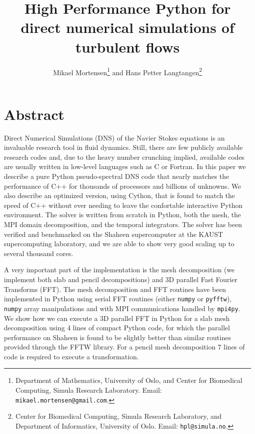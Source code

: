 \documentclass[11pt, oneside]{article}
\title{High Performance Python for direct numerical simulations of turbulent flows}
\author{Mikael Mortensen\thanks{Department of Mathematics, University of Oslo, and Center for Biomedical Computing, Simula Research Laboratory. Email: \texttt{mikael.mortensen@gmail.com}.} and Hans Petter Langtangen\thanks{Center for Biomedical Computing, Simula Research Laboratory, and Department of Informatics, University of Oslo. Email: \texttt{hpl@simula.no}.}}
\newcommand{\inpyth}{\lstinline[keywordstyle={}, basicstyle=\ttfamily]} %[]%
\begin{document}
\maketitle

\section*{Abstract}
Direct Numerical Simulations (DNS) of the Navier Stokes equations is an
invaluable research tool in fluid dynamics. Still, there are few publicly
available research codes and, due to the heavy number crunching implied,
available codes are usually written in low-level
languages such as C or Fortran.
In this paper we describe a pure Python pseudo-spectral DNS code
that nearly matches the performance of C++ for thousands of processors
and billions of unknowns. We also describe an optimized version, using
Cython, that is found to match the speed of C++ without ever needing to leave
the confortable interactive Python environment. The solver is written from
scratch in Python, both the mesh, the MPI domain decomposition, and the
temporal integrators. The solver
has been verified and benchmarked on the Shaheen supercomputer at the
KAUST supercomputing laboratory,
and we are able to show very good scaling up to several thousand cores.

A very important part of the implementation is the mesh decomposition (we implement both slab and pencil decompositions) and 3D parallel Fast Fourier Transforms (FFT). The mesh decomposition and FFT routines have been implemented in Python using serial FFT routines (either \inpyth{numpy} or \inpyth{pyfftw}), \inpyth{numpy} array manipulations and with MPI communications handled by \inpyth{mpi4py}. We show how we can execute a 3D parallel FFT in Python for a slab mesh decomposition using 4 lines of compact Python code, for which the parallel performance on Shaheen is found to be slightly better than similar routines provided through the FFTW library. For a pencil mesh decomposition 7 lines of code is required to execute a transformation.
\end{document}
